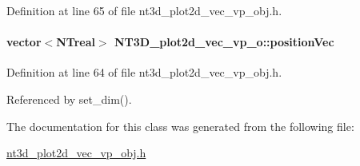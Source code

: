 Definition at line 65 of file nt3d\_\-plot2d\_\-vec\_\-vp\_\-obj.h.

\paragraph[{positionVec}]{\setlength{\rightskip}{0pt plus 5cm}vector$<${\bf NTreal}$>$ {\bf NT3D\_\-plot2d\_\-vec\_\-vp\_\-o::positionVec}}\hfill\label{class_n_t3_d__plot2d__vec__vp__o_a3e0595deccf8ab69fad2bc3e99e2f1e3}


Definition at line 64 of file nt3d\_\-plot2d\_\-vec\_\-vp\_\-obj.h.



Referenced by set\_\-dim().



The documentation for this class was generated from the following file:\begin{DoxyCompactItemize}
\item 
\hyperlink{nt3d__plot2d__vec__vp__obj_8h}{nt3d\_\-plot2d\_\-vec\_\-vp\_\-obj.h}\end{DoxyCompactItemize}
